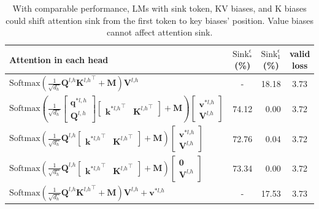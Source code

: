 \begin{table}[t]
\vspace{-1.1cm}
\caption{With comparable performance, LMs with sink token, KV biases, and K biases could shift attention sink from the first token to key biases' position. Value biases cannot affect attention sink.}
\vspace{-.4cm}
\begin{center}
\begin{tabular}{l|ccc}
\toprule
 Attention in each head  &  $\textrm{Sink}_{*}^{\epsilon}$(\%) &  $\textrm{Sink}_1^{\epsilon}$(\%) &valid loss \\
\midrule
 $\textrm{Softmax}\left(\frac{1}{\sqrt{d_h}}\boldsymbol{Q}^{l\textrm{,}h}{\boldsymbol{K}^{l\textrm{,}h}}^\top+ \boldsymbol{M}\right)\boldsymbol{V}^{l\textrm{,}h}$ & - & 18.18 & 3.73 \\
 $\textrm{Softmax}\left(\frac{1}{\sqrt{d_h}}\begin{bmatrix}
    \boldsymbol{q}^{*l,h} \\
        \boldsymbol{Q}^{l,h}
    \end{bmatrix}\begin{bmatrix}
       {\boldsymbol{k}^{*l\textrm{,}h}}^\top & {\boldsymbol{K}^{l\textrm{,}h}}^\top
    \end{bmatrix}+ \boldsymbol{M}\right)\begin{bmatrix}
    \boldsymbol{v}^{*l\textrm{,}h} \\
    \boldsymbol{V}^{l\textrm{,}h}
\end{bmatrix}$ & 74.12 & \,\,\,0.00 &  3.72\\
 $\textrm{Softmax}\left(\frac{1}{\sqrt{d_h}}\boldsymbol{Q}^{l\textrm{,}h}\begin{bmatrix}
       {\boldsymbol{k}^{*l\textrm{,}h}}^\top & {\boldsymbol{K}^{l\textrm{,}h}}^\top
    \end{bmatrix}+ \boldsymbol{M}\right)\begin{bmatrix}
    \boldsymbol{v}^{*l\textrm{,}h} \\
    \boldsymbol{V}^{l\textrm{,}h}
\end{bmatrix}$ & 72.76 & \,\,\,0.04 & 3.72\\
 $\textrm{Softmax}\left(\frac{1}{\sqrt{d_h}}\boldsymbol{Q}^{l\textrm{,}h}\begin{bmatrix}
       {\boldsymbol{k}^{*l\textrm{,}h}}^\top & {\boldsymbol{K}^{l\textrm{,}h}}^\top
    \end{bmatrix}+ \boldsymbol{M}\right)\begin{bmatrix}
    \boldsymbol{0} \\
    \boldsymbol{V}^{l\textrm{,}h}
\end{bmatrix}$ & 73.34 & \,\,\,0.00 & 3.72 \\
 $\textrm{Softmax}\left(\frac{1}{\sqrt{d_h}}\boldsymbol{Q}^{l\textrm{,}h}{\boldsymbol{K}^{l\textrm{,}h}}^\top+ \boldsymbol{M}\right)\boldsymbol{V}^{l\textrm{,}h}+\boldsymbol{v}^{*l\textrm{,}h}$ & - & 17.53 & 3.73\\
\bottomrule
\end{tabular}
\end{center}
\vspace{-.2cm}
\label{bias}
\end{table}

